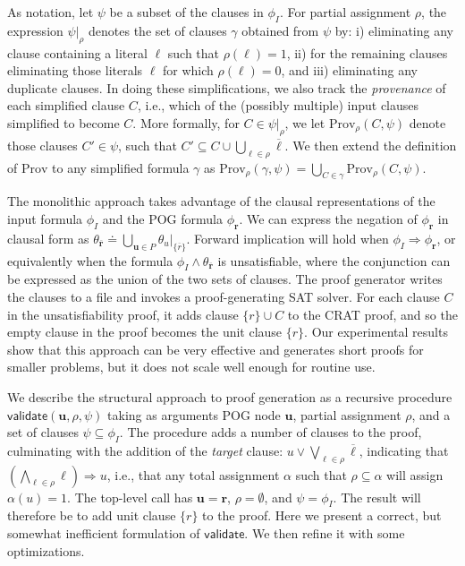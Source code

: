 \documentclass[letterpaper,USenglish,cleveref, autoref, thm-restate]{lipics-v2021}
\newcommand{\obar}[1]{\overline{#1}}
\newcommand{\lit}{\ell}
\newcommand{\imply}{\Rightarrow}
\newcommand{\assign}{\alpha}
\newcommand{\passign}{\rho}
\newcommand{\validate}{\textsf{validate}}
\newcommand{\prov}{\textrm{Prov}}
\newcommand{\inputformula}{\phi_I}
\newcommand{\makenode}[1]{\mathbf{#1}}
\newcommand{\nodeu}{\makenode{u}}
\newcommand{\noder}{\makenode{r}}
\newcommand{\simplify}[2]{#1|_{#2}}
\begin{document}
As notation,
let $\psi$ be a subset of the clauses in $\inputformula$.
For partial assignment
$\passign$, the expression  $\simplify{\psi}{\passign}$ denotes the set of clauses $\gamma$
obtained from $\psi$ by: i) eliminating any
clause containing a literal $\lit$ such that $\passign(\lit) = 1$,
ii) for the remaining clauses eliminating those literals $\lit$ for
which $\passign(\lit) = 0$, and iii) eliminating any duplicate clauses.
In doing these simplifications, we also track the {\em provenance}
of each simplified clause $C$, i.e., which of the (possibly multiple) input clauses simplified to become $C$.
More formally, for $C \in \simplify{\psi}{\passign}$, we let $\prov_{\passign}(C, \psi)$ denote
those clauses $C' \in \psi$, such that
$C' \subseteq C \cup \bigcup_{\lit \in \passign} \obar{\lit}$.
We then extend the definition of $\prov$ to any simplified formula
$\gamma$ as $\prov_{\passign}(\gamma, \psi) = \bigcup_{C \in \gamma} \prov_{\passign}(C, \psi)$.

The monolithic approach
takes advantage of the clausal representations of
the input formula $\inputformula$ and the POG formula $\phi_\noder$.
We can express the negation of $\phi_\noder$ in clausal form as
$\theta_{\obar{\noder}} \doteq \bigcup_{\nodeu\in P} \simplify{\theta_{u}}{\{\obar{r}\}}$.
Forward implication will hold when $\inputformula \imply \phi_\noder$, or  equivalently
when the formula $\inputformula \land \theta_{\obar{\noder}}$
is unsatisfiable, where the
conjunction can be expressed as the union
of the two sets of clauses.  The proof generator writes the clauses to a file and invokes a proof-generating SAT solver.
For each clause $C$ in the unsatisfiability proof, it adds clause $\{r\} \cup C$ to the CRAT proof, and so the empty clause in the proof becomes the unit clause $\{r\}$.
Our experimental results show
that this approach can be very effective and generates short proofs
for smaller problems, but it does not scale well enough for routine
use.


We describe the structural approach to proof generation as a recursive procedure
$\validate(\nodeu, \passign, \psi)$ taking as arguments POG
node $\nodeu$, partial assignment
$\passign$, and a set of clauses $\psi \subseteq \inputformula$.
The procedure adds a number of clauses to the proof, culminating with
the addition of the {\em target} clause:
$u \lor \bigvee_{\lit \in \passign} \obar{\lit}$, indicating
that $(\bigwedge_{\lit \in \passign} \lit) \imply u$, i.e.,
that any total
assignment $\assign$ such that $\passign \subseteq \assign$
will assign $\assign(u) = 1$.
The top-level call has $\nodeu = \noder$, $\passign = \emptyset$, and $\psi = \inputformula$.
The result will therefore be to add unit clause $\{r\}$ to the proof.
Here we present a correct, but somewhat inefficient formulation of
$\validate$.  We then refine it with some optimizations.
\end{document}
